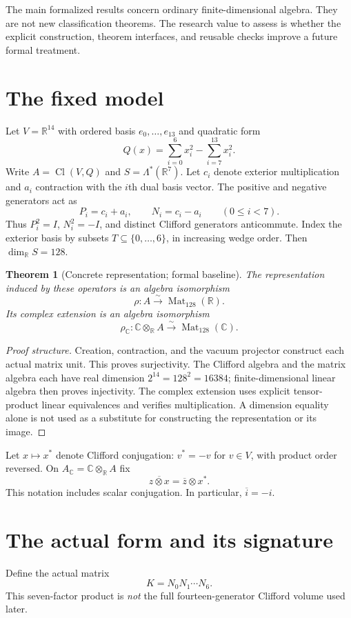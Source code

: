 \documentclass[11pt]{article}
\newtheorem{theorem}{Theorem}[section]
\newcommand{\R}{\mathbb R}
\newcommand{\C}{\mathbb C}
\newcommand{\Cl}{\operatorname{Cl}}
\newcommand{\Mat}{\operatorname{Mat}}
\begin{document}
The main formalized results concern ordinary finite-dimensional algebra. They are not new classification theorems. The research value to assess is whether the explicit construction, theorem interfaces, and reusable checks improve a future formal treatment.

\section{The fixed model}
Let $V=\R^{14}$ with ordered basis $e_0,\ldots,e_{13}$ and quadratic form
\[
 Q(x)=\sum_{i=0}^{6}x_i^2-\sum_{i=7}^{13}x_i^2.
\]
Write $A=\Cl(V,Q)$ and $S=\Lambda^*(\R^7)$. Let $c_i$ denote exterior multiplication and $a_i$ contraction with the $i$th dual basis vector. The positive and negative generators act as
\[
 P_i=c_i+a_i,\qquad N_i=c_i-a_i\qquad(0\le i<7).
\]
Thus $P_i^2=I$, $N_i^2=-I$, and distinct Clifford generators anticommute. Index the exterior basis by subsets $T\subseteq\{0,\ldots,6\}$, in increasing wedge order. Then $\dim_\R S=128$.

\begin{theorem}[Concrete representation; formal baseline]
The representation induced by these operators is an algebra isomorphism
\[
 \rho:A\xrightarrow{\sim}\Mat_{128}(\R).
\]
Its complex extension is an algebra isomorphism
\[
 \rho_\C:\C\otimes_\R A\xrightarrow{\sim}\Mat_{128}(\C).
\]
\end{theorem}
\begin{proof}[Proof structure]
Creation, contraction, and the vacuum projector construct each actual matrix unit. This proves surjectivity. The Clifford algebra and the matrix algebra each have real dimension $2^{14}=128^2=16384$; finite-dimensional linear algebra then proves injectivity. The complex extension uses explicit tensor-product linear equivalences and verifies multiplication. A dimension equality alone is not used as a substitute for constructing the representation or its image.
\end{proof}

Let $x\mapsto x^*$ denote Clifford conjugation: $v^*=-v$ for $v\in V$, with product order reversed. On $A_\C=\C\otimes_\R A$ fix
\[
 \overline{z\otimes x}=\overline z\otimes x^*.
\]
This notation includes scalar conjugation. In particular, $\overline{i}=-i$.

\section{The actual form and its signature}
Define the actual matrix
\[
 K=N_0N_1\cdots N_6.
\]
This seven-factor product is \emph{not} the full fourteen-generator Clifford volume used later.
\end{document}
